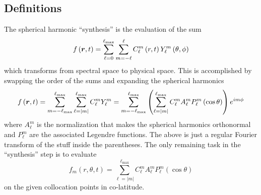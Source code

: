 \documentclass[10pt,letterpaper]{article}
\begin{document}
\subsection{Definitions}
The spherical harmonic ``synthesis'' is the evaluation of the sum
\begin{equation}
 f\left(\bm{r},t\right) = \sum\limits_{\ell=0}^{\ell_\mathrm{max}}
                                 \sum\limits_{m=-\ell}^{\ell}
                C_\ell^m\left(r,t\right) Y_\ell^m\left(\theta,\phi\right)
\end{equation}
which transforms from spectral space to physical space. This is accomplished by
swapping the order of the sums and expanding the spherical harmonics
\begin{equation}
 f\left(\bm{r},t\right) =
           \sum\limits_{m=-\ell_{\mathrm{max}}}^{\ell_\mathrm{max}}
                 \sum\limits_{\ell=|m|}^{\ell_\mathrm{max}}
                 C_\ell^m Y_\ell^m
          =
           \sum\limits_{m=-\ell_{\mathrm{max}}}^{\ell_\mathrm{max}}
            \left(
                 \sum\limits_{\ell=|m|}^{\ell_\mathrm{max}}
                    C_\ell^m A_\ell^m P_\ell^m\left(\cos\theta\right)
            \right)
              e^{i m\phi}
\end{equation}
where $A_\ell^m$ is the normalization that makes the spherical harmonics orthonormal
and $P_\ell^m$ are the associated Legendre functions. The above is just a
regular Fourier transform of the stuff inside the parentheses.
The only remaining task in the ``synthesis'' step is to evaluate
\begin{equation}
 f_m\left(r,\theta,t\right) =
                 \sum\limits_{\ell=|m|}^{\ell_\mathrm{max}}
                    C_\ell^m A_\ell^m P_\ell^m\left(\cos\theta\right)
\end{equation}
on the given collocation points in co-latitude.
\end{document}
